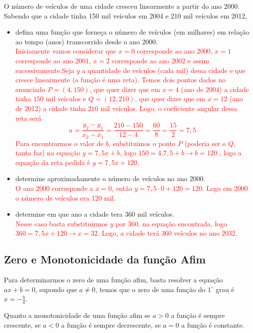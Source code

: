 \begin{exe}\label{ex1}O número de veículos de uma cidade cresceu linearmente a partir do ano $2000.$ Sabendo que a cidade tinha 150 mil veículos em 2004  e 210 mil veículos em 2012,
\begin{itemize}
\item[a)] defina uma função que forneça o número de veículos (em milhares) em relação ao tempo (anos) transcorrido desde o ano 2000. \\
\textcolor{red}{ Iniciamente vamos considerar que $x=0$ corresponde ao ano $2000$, $x=1$ corresponde ao ano $2001$, $x=2$ corresponde ao ano $2002$ e assim sucessivamente.Seja $y$ a quantidade de veículos (cada mil) dessa cidade e que cresce linearmente (a função é uma reta). Temos dois pontos dados no enunciado $P=(4,150)$, que quer dizer que em $x=4$ (ano de 2004) a cidade tinha $150$ mil veículos e  $Q=(12,210)$, que quer dizer que em $x=12$ (ano de 2012) a cidade tinha $210$ mil veículos. Logo, o coeficiente angular dessa reta será $$a= \frac{y_2-y_1}{x_2-x_1}=\frac{210-150}{12-4}=\frac{60}{8}=\frac{15}{2}=7,5$$
Para encontrarmos o valor de $b$, substituimos o ponto $P$ (poderia ser o $Q$, tanto faz) na equação $y=7,5x+b$, logo $150=4.7,5+b \to b=120$ , logo a equação da reta pedida é $y=7,5x+120$.}
\item[b)]determine aproximadamente o número de veículos no ano 2000. \\
\textcolor{red}{O ano 2000 corresponde a $x=0$, então $y=7,5\cdot0+120=120$. Logo em 2000 o número de veículos era 120 mil.}
\item[c)] determine em que ano a cidade tera 360 mil veículos. \\
\textcolor{red}{Nesse caso basta substituirmos $y$ por $360$, na equação encontrada, logo $360=7,5x+120 \to x=32$. Logo, a cidade terá $360 $ veículos no ano $2032$.}
\end{itemize}

\end{exe}

\subsection{Zero e Monotonicidade da função Afim}

Para determinarmos o zero de uma função afim, basta resolver a equação $ax+b=0$, supondo que $a \neq 0$, temos que o zero de uma função do $1^{\circ}$ grau é $x=-\frac{b}{a}$.

Quanto a monotonicidade de uma função afim se $a>0$ a função é sempre crescente, se $a<0$ a função é sempre decrescente, se $a=0$ a função é constante.

